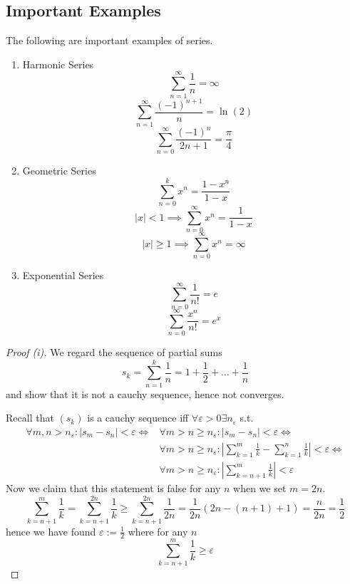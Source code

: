 \subsection{Important Examples}
\begin{proposition}
   The following are important examples of series.
   \begin{enumerate}[label=\roman*, align=Center]
      \item Harmonic Series
         \[\sum_{n=1}^\infty \frac{1}{n} = \infty\]
         \[\sum_{n=1}^\infty \frac{(-1)^{n+1}}{n} = \ln(2)\]
         \[\sum_{n=0}^\infty \frac{(-1)^n}{2n+1} = \frac{\pi}{4}\]
      \item Geometric Series
         \[\sum_{n=0}^k x^n = \frac{1-x^n}{1-x}\]
         \[|x| < 1 \implies \sum_{n = 0}^\infty x^n = \frac{1}{1 - x}\]
         \[|x| \geq 1 \implies \sum_{n = 0}^\infty x^n = \infty\]
      \item Exponential Series
         \[\sum_{n=0}^\infty \frac{1}{n!} = e\]
         \[\sum_{n=0}^\infty \frac{x^n}{n!} = e^x\]
   \end{enumerate}
\end{proposition}
\begin{proof}[Proof (i)]
   We regard the sequence of partial sums
   \[s_k = \sum_{n = 1}^k \frac{1}{n} = 1 + \frac{1}{2} + \ldots + \frac{1}{n}\]
   and show that it is not a cauchy sequence, hence not converges.

   Recall that \((s_k)\) is a cauchy sequence iff \(\forall \varepsilon > 0 \exists n_\varepsilon\) s.t.
   \begin{equation*}
      \begin{split}
         \forall m, n > n_\varepsilon: |s_m - s_n| < \varepsilon \iff & \forall m > n \geq n_\varepsilon: |s_m - s_n| < \varepsilon \iff \\
                                                                      & \forall m > n \geq n_\varepsilon: \left|\sum_{k=1}^m \frac{1}{k} - \sum_{k = 1}^n \frac{1}{k}\right| < \varepsilon \iff \\
                                                                      & \forall m > n \geq n_\varepsilon: \left|\sum_{k=n+1}^m \frac{1}{k}\right| < \varepsilon
      \end{split}
   \end{equation*}
   Now we claim that this statement is false for any \(n\) when we set \(m = 2n\).
   \[\sum_{k=n+1}^{m} \frac{1}{k} = \sum_{k=n+1}^{2n} \frac{1}{k} \geq \sum_{k=n+1}^{2n} \frac{1}{2n} = \frac{1}{2n} (2n - (n+1) + 1) = \frac{n}{2n} = \frac{1}{2}\]
   hence we have found \(\varepsilon := \frac{1}{2}\) where for any \(n\)
   \[\sum_{k=n+1}^{m} \frac{1}{k} \geq \varepsilon\]
\end{proof}
